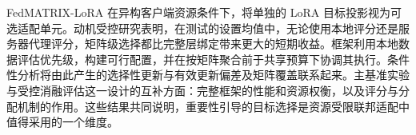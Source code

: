 FedMATRIX-LoRA 在异构客户端资源条件下，将单独的 LoRA 目标投影视为可选适配单元。动机受控研究表明，在测试的设置均值中，无论使用本地评分还是服务器代理评分，矩阵级选择都比完整层绑定带来更大的短期收益。框架利用本地数据评估优先级，构建可行配置，并在按矩阵聚合前于共享预算下协调其执行。条件性分析将由此产生的选择性更新与有效更新偏差及矩阵覆盖联系起来。主基准实验与受控消融评估这一设计的互补方面：完整框架的性能和资源权衡，以及评分与分配机制的作用。这些结果共同说明，重要性引导的目标选择是资源受限联邦适配中值得采用的一个维度。

